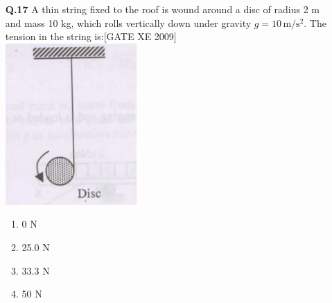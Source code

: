 \documentclass[journal,12pt,onecolumn]{IEEEtran}
\theoremstyle{remark}
\begin{document}
\begin{enumerate}
\vspace{0.3cm}

\item[\textbf{Q.17}] A thin string fixed to the roof is wound around a disc of radius 2 m and mass 10 kg, which rolls vertically down under gravity $g=10\,\mathrm{m/s^2}$. The tension in the string is:\hfill[GATE XE 2009]\\


    \includegraphics[width=0.5\columnwidth]{figs/fig19.png}
    

\begin{multicols}{2}
\begin{enumerate}
    \item 0 N
    \item 25.0 N
    \item 33.3 N
    \item 50 N
\end{enumerate}
\end{multicols}


\vspace{0.3cm}


\end{enumerate}
\end{document}
